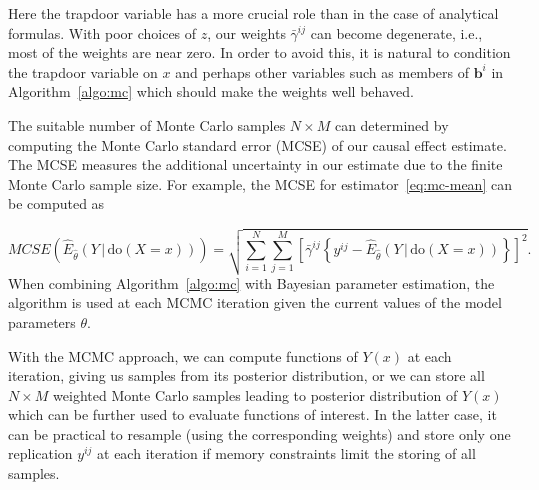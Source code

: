 \documentclass[11pt,a4paper,twoside]{article}
\newcommand{\+}[1]{\ensuremath{\mathbf{#1}}}
\newcommand{\po}[2]{#1(#2)}
\newcommand{\doo}{\textrm{do}}
\newcommand{\given}{{ \, | \, }}
\begin{document}
Here the trapdoor variable has a more crucial role than in the case of analytical formulas. With poor choices of $z$, our weights $\bar \gamma^{ij}$ can become degenerate, i.e., most of the weights are near zero. In order to avoid this, it is natural to condition the trapdoor variable on $x$ and perhaps other variables such as members of $\+ b^i$ in Algorithm~\ref{algo:mc} which should make the weights well behaved.

The suitable number of Monte Carlo samples $N \times M$ can determined by computing the Monte Carlo standard error (MCSE) of our causal effect estimate. The MCSE measures the additional uncertainty in our estimate due to the finite Monte Carlo sample size. For example, the MCSE for estimator~\eqref{eq:mc-mean} can be computed as

\begin{equation*}
MCSE\left(\widehat E_{\hat \theta}(Y \given \doo(X = x))\right) = \sqrt{\sum_{i=1}^N\sum_{j=1}^M\left[\bar \gamma^{ij} \left\{y^{ij} - \widehat E_{\hat \theta}(Y \given \doo(X = x))\right\}\right]^2}.
\end{equation*} 
When combining Algorithm~\ref{algo:mc} with Bayesian parameter estimation, the algorithm is used at each MCMC iteration given the current values of the model parameters $\theta$. 
	
With the MCMC approach, we can compute functions of $\po{Y}{x}$ at each iteration, giving us samples from its posterior distribution, or we can store all $N \times M$ weighted Monte Carlo samples leading to posterior distribution of $\po{Y}{x}$ which can be further used to evaluate functions of interest. In the latter case, it can be practical to resample (using the corresponding weights) and store only one replication $y^{ij}$ at each iteration if memory constraints limit the storing of all samples.
	

	

	
\end{document}
